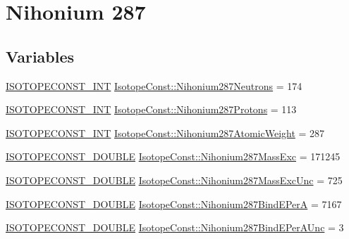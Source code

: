\hypertarget{group___isotope_const-_nihonium-_nh287}{}\section{Nihonium 287}
\label{group___isotope_const-_nihonium-_nh287}
\subsection*{Variables}
\begin{DoxyCompactItemize}
\item 
\mbox{\hyperlink{group___isotope_const-_macros_ga5f18360b3e99483a35c32d789e62621c}{I\+S\+O\+T\+O\+P\+E\+C\+O\+N\+S\+T\+\_\+\+I\+NT}} \mbox{\hyperlink{group___isotope_const-_nihonium-_nh287_ga82f534fb4eec20044cefa6db3bf779c7}{Isotope\+Const\+::\+Nihonium287\+Neutrons}} = 174
\item 
\mbox{\hyperlink{group___isotope_const-_macros_ga5f18360b3e99483a35c32d789e62621c}{I\+S\+O\+T\+O\+P\+E\+C\+O\+N\+S\+T\+\_\+\+I\+NT}} \mbox{\hyperlink{group___isotope_const-_nihonium-_nh287_ga6fbb4a6b038d92c2b20418e9f1b1e39d}{Isotope\+Const\+::\+Nihonium287\+Protons}} = 113
\item 
\mbox{\hyperlink{group___isotope_const-_macros_ga5f18360b3e99483a35c32d789e62621c}{I\+S\+O\+T\+O\+P\+E\+C\+O\+N\+S\+T\+\_\+\+I\+NT}} \mbox{\hyperlink{group___isotope_const-_nihonium-_nh287_gab30ffe5f775637aefe967ad05c7610d2}{Isotope\+Const\+::\+Nihonium287\+Atomic\+Weight}} = 287
\item 
\mbox{\hyperlink{group___isotope_const-_macros_ga8f45a7272ce02c0b4c65c44636ed719a}{I\+S\+O\+T\+O\+P\+E\+C\+O\+N\+S\+T\+\_\+\+D\+O\+U\+B\+LE}} \mbox{\hyperlink{group___isotope_const-_nihonium-_nh287_ga0da25ee7cfef5eef2e46643e8fed6a23}{Isotope\+Const\+::\+Nihonium287\+Mass\+Exc}} = 171245
\item 
\mbox{\hyperlink{group___isotope_const-_macros_ga8f45a7272ce02c0b4c65c44636ed719a}{I\+S\+O\+T\+O\+P\+E\+C\+O\+N\+S\+T\+\_\+\+D\+O\+U\+B\+LE}} \mbox{\hyperlink{group___isotope_const-_nihonium-_nh287_ga73fcc3515a4a62828cd16b003e823664}{Isotope\+Const\+::\+Nihonium287\+Mass\+Exc\+Unc}} = 725
\item 
\mbox{\hyperlink{group___isotope_const-_macros_ga8f45a7272ce02c0b4c65c44636ed719a}{I\+S\+O\+T\+O\+P\+E\+C\+O\+N\+S\+T\+\_\+\+D\+O\+U\+B\+LE}} \mbox{\hyperlink{group___isotope_const-_nihonium-_nh287_gae03b2a595748ece9ca76442c20501a1d}{Isotope\+Const\+::\+Nihonium287\+Bind\+E\+PerA}} = 7167
\item 
\mbox{\hyperlink{group___isotope_const-_macros_ga8f45a7272ce02c0b4c65c44636ed719a}{I\+S\+O\+T\+O\+P\+E\+C\+O\+N\+S\+T\+\_\+\+D\+O\+U\+B\+LE}} \mbox{\hyperlink{group___isotope_const-_nihonium-_nh287_ga6df0b347030b0711a2a581d46244b0ed}{Isotope\+Const\+::\+Nihonium287\+Bind\+E\+Per\+A\+Unc}} = 3

\end{DoxyCompactItemize}

